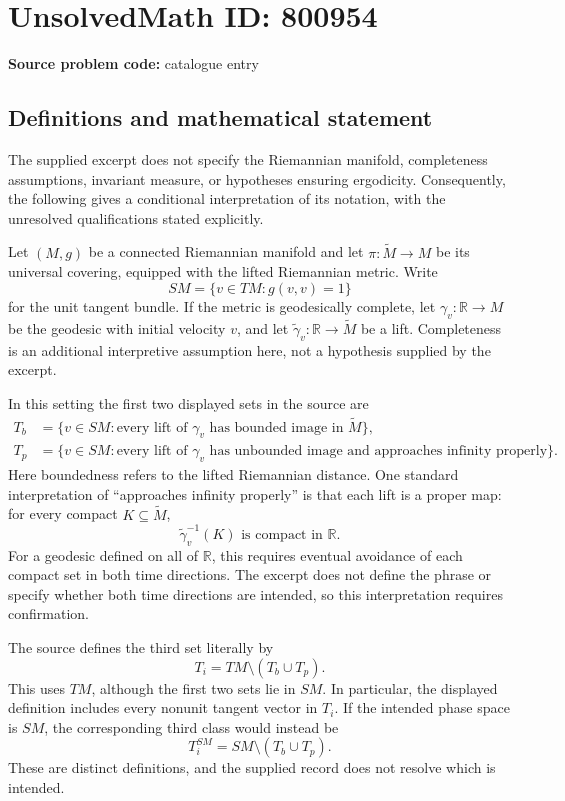 \documentclass[11pt]{article}
\newcommand{\R}{\mathbb{R}}
\begin{document}
\section*{UnsolvedMath ID: 800954}
\textbf{Source problem code:} catalogue entry
\subsection{Definitions and mathematical statement}
The supplied excerpt does not specify the Riemannian manifold, completeness assumptions, invariant measure, or hypotheses ensuring ergodicity. Consequently, the following gives a conditional interpretation of its notation, with the unresolved qualifications stated explicitly.

Let \((M,g)\) be a connected Riemannian manifold and let \(\pi:\widetilde M\to M\) be its universal covering, equipped with the lifted Riemannian metric. Write
\[
SM=\{v\in TM:g(v,v)=1\}
\]
for the unit tangent bundle. If the metric is geodesically complete, let \(\gamma_v:\R\to M\) be the geodesic with initial velocity \(v\), and let \(\widetilde\gamma_v:\R\to\widetilde M\) be a lift. Completeness is an additional interpretive assumption here, not a hypothesis supplied by the excerpt.

In this setting the first two displayed sets in the source are
\begin{align*}
T_b&=\{v\in SM: \text{every lift of }\gamma_v\text{ has bounded image in }\widetilde M\},\\
T_p&=\{v\in SM: \text{every lift of }\gamma_v\text{ has unbounded image and approaches infinity properly}\}.
\end{align*}
Here boundedness refers to the lifted Riemannian distance. One standard interpretation of ``approaches infinity properly'' is that each lift is a proper map: for every compact \(K\subseteq\widetilde M\),
\[
\widetilde\gamma_v^{-1}(K)\text{ is compact in }\R.
\]
For a geodesic defined on all of \(\R\), this requires eventual avoidance of each compact set in both time directions. The excerpt does not define the phrase or specify whether both time directions are intended, so this interpretation requires confirmation.

The source defines the third set literally by
\[
T_i=TM\setminus(T_b\cup T_p).
\]
This uses \(TM\), although the first two sets lie in \(SM\). In particular, the displayed definition includes every nonunit tangent vector in \(T_i\). If the intended phase space is \(SM\), the corresponding third class would instead be
\[
T_i^{SM}=SM\setminus(T_b\cup T_p).
\]
These are distinct definitions, and the supplied record does not resolve which is intended.
\end{document}

